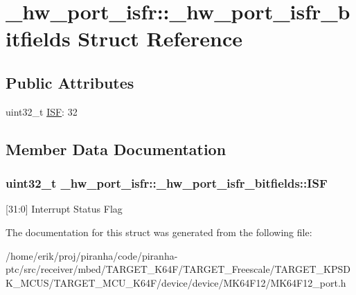 \hypertarget{struct__hw__port__isfr_1_1__hw__port__isfr__bitfields}{}\section{\+\_\+hw\+\_\+port\+\_\+isfr\+:\+:\+\_\+hw\+\_\+port\+\_\+isfr\+\_\+bitfields Struct Reference}
\label{struct__hw__port__isfr_1_1__hw__port__isfr__bitfields}
\subsection*{Public Attributes}
\begin{DoxyCompactItemize}
\item 
uint32\+\_\+t \hyperlink{struct__hw__port__isfr_1_1__hw__port__isfr__bitfields_a0cc94f3cc191fc0246ae2b5faa5eb84b}{I\+SF}\+: 32
\end{DoxyCompactItemize}


\subsection{Member Data Documentation}
\subsubsection[{\texorpdfstring{I\+SF}{ISF}}]{\setlength{\rightskip}{0pt plus 5cm}uint32\+\_\+t \+\_\+hw\+\_\+port\+\_\+isfr\+::\+\_\+hw\+\_\+port\+\_\+isfr\+\_\+bitfields\+::\+I\+SF}\hypertarget{struct__hw__port__isfr_1_1__hw__port__isfr__bitfields_a0cc94f3cc191fc0246ae2b5faa5eb84b}{}\label{struct__hw__port__isfr_1_1__hw__port__isfr__bitfields_a0cc94f3cc191fc0246ae2b5faa5eb84b}
\mbox{[}31\+:0\mbox{]} Interrupt Status Flag 

The documentation for this struct was generated from the following file\+:\begin{DoxyCompactItemize}
\item 
/home/erik/proj/piranha/code/piranha-\/ptc/src/receiver/mbed/\+T\+A\+R\+G\+E\+T\+\_\+\+K64\+F/\+T\+A\+R\+G\+E\+T\+\_\+\+Freescale/\+T\+A\+R\+G\+E\+T\+\_\+\+K\+P\+S\+D\+K\+\_\+\+M\+C\+U\+S/\+T\+A\+R\+G\+E\+T\+\_\+\+M\+C\+U\+\_\+\+K64\+F/device/device/\+M\+K64\+F12/M\+K64\+F12\+\_\+port.\+h\end{DoxyCompactItemize}
